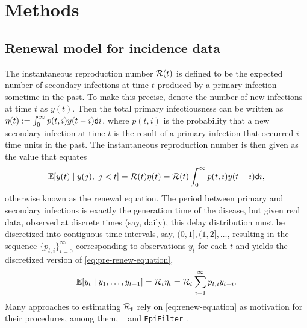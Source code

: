 \section{Methods}


\subsection{Renewal model for incidence data} 

The instantaneous reproduction number $\mathcal{R}(t)$ is defined to be the expected
number of secondary infections at time $t$ produced by a primary infection
sometime in the past. To make this precise, denote the number of new infections
at time $t$ as $y(t)$. Then the total primary infectiousness can be written as
$\eta(t) := \int_0^{\infty} p(t,i) y(t-i) \mathsf{d} i$, where $p(t,i)$ is the
probability that a new secondary infection at time $t$ is the result of a
primary infection that occurred $i$ time units in the past. The instantaneous
reproduction number is then given as the value that equates
\begin{equation} \label{eq:pre-renew-equation}
  \mathbb{E}[y(t) \mid y(j),\ j<t]=\mathcal{R}(t)\eta(t)=\mathcal{R}(t)\int_0^\infty p(t,i)y(t-i)\mathsf{d} i,
\end{equation}
otherwise known as the renewal equation. The period between primary and
secondary infections is exactly the generation time of the disease, but given
real data, observed at discrete times (say, daily), this delay distribution must
be discretized into contiguous time intervals, say, $(0,1], (1,2], \ldots$,
resulting in the sequence $\{p_{t,i}\}_{i=0}^\infty$ corresponding to
observations $y_t$ for each $t$ and yields the discretized version of
\eqref{eq:pre-renew-equation},
\begin{equation} \label{eq:renew-equation}
  \mathbb{E}[y_t \mid y_1,\ldots,y_{t-1}]=\mathcal{R}_t\eta_t=\mathcal{R}_t\sum_{i = 1}^\infty p_{t,i} y_{t-i}.
\end{equation}
Many approaches to estimating $\mathcal{R}_t$ rely on \eqref{eq:renew-equation} as
motivation for their procedures, among them, \EpiEstim\ \citep{cori2013new} 
and \texttt{EpiFilter} \citep{parag2021improved}. 


